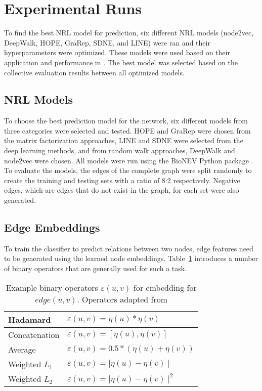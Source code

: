 \section{Experimental Runs}

To find the best \ac{NRL} model for prediction, six different \ac{NRL} models (node2vec, DeepWalk, \ac{HOPE}, \ac{GraRep}, \ac{SDNE}, and \ac{LINE}) were ran and their hyperparameters were optimized.
These models were used based on their application and performance in \cite{yue_graph_2019}.
The best model was selected based on the collective evaluation results between all optimized models.

\subsection{\ac{NRL} Models}

To choose the best prediction model for the network, six different models from three categories were selected and tested.
\ac{HOPE} and \ac{GraRep} were chosen from the matrix factorization approaches, \ac{LINE} and \ac{SDNE} were selected from the deep learning methods, and from random walk approaches, DeepWalk and node2vec were chosen.
All models were run using the BioNEV Python package \cite{yue_graph_2019}.
To evaluate the models, the edges of the complete graph were split randomly to create the training and testing sets with a ratio of 8:2 respectively.
Negative edges, which are edges that do not exist in the graph, for each set were also generated.

\subsection{Edge Embeddings}

To train the classifier to predict relations between two nodes, edge features need to be generated using the learned node embeddings.
Table~\ref{tab:operators} introduces a number of binary operators that are generally used for such a task.

\begin{table}[h!]
    \centering
    \begin{tabular}{ |l|l| } 
        \hline
        Hadamard & $\varepsilon(u,v)= \eta(u)*\eta(v)$ \\ 
        \hline
        Concatenation & $\varepsilon(u,v)=[\eta(u), \eta(v)]$ \\ 
        \hline
        Average & $\varepsilon(u,v)=0.5*(\eta(u)+\eta(v))$ \\ 
        \hline
        Weighted $L_{1}$ & $\varepsilon(u,v)=\mid\eta(u)-\eta(v)\mid$ \\
        \hline
        Weighted $L_{2}$ & $\varepsilon(u,v)=\mid\eta(u)-\eta(v)\mid^2$ \\
        \hline
    \end{tabular}
    \caption[Example binary operators $\varepsilon(u,v)$ for embedding for $edge(u,v)$]{Example binary operators $\varepsilon(u,v)$ for embedding for $edge(u,v)$. Operators adapted from \cite{grover_node2vec:_2016}}
    \label{tab:operators}
\end{table}


